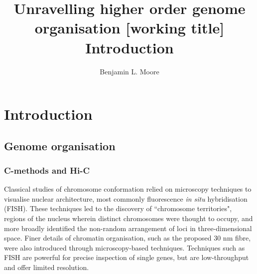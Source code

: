 \documentclass[a4paper,10pt,oneside]{book}
\title{ \vspace{3in} Unravelling higher order genome organisation {\small [working
    title]} \\ \vspace{2em} {\large {\bf Introduction}} }
\author{Benjamin L. Moore}
\begin{document}

\chapter{Introduction}
\section{Genome organisation}
%
%

\subsection{C-methods and Hi-C}

Classical studies of chromosome conformation relied on microscopy techniques to visualise nuclear architecture, most commonly fluorescence \emph{in situ} hybridisation (FISH). These techniques led to the discovery of ``chromosome territories", regions of the nucleus wherein distinct chromosomes were thought to occupy, and more broadly identified the non-random arrangement of loci in three-dimensional space.\cite{DeWit2012, VanSteensel2010} Finer details of chromatin organisation, such as the proposed 30 nm fibre, were also introduced through microscopy-based techniques. Techniques such as FISH are powerful for precise inspection of single genes, but are low-throughput and offer limited resolution.\cite{DeWit2012}
\end{document}

